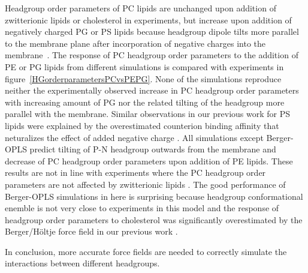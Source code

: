 \documentclass[journal=jpcbfk]{achemso}
\begin{document}
Headgroup order parameters of PC lipids are unchanged upon addition
of zwitterionic lipids or cholesterol in experiments, but increase
upon addition of negatively charged PG or PS lipids because
headgroup dipole tilts more parallel to the membrane plane after incorporation
of negative charges into the membrane~\cite{seelig87, scherer87,antila18}.
The response of PC headgroup order parameters to the addition of PE or PG lipids
from different simulations is compared with experiments in figure~\ref{HGorderparametersPCvsPEPG}.
None of the simulations reproduce neither the experimentally observed increase in PC headgroup order parameters
with increasing amount of PG nor the related tilting of the headgroup more parallel with the membrane.
Similar observations in our previous work for PS lipids were explained by the overestimated counterion
binding affinity that neturalizes the effect of added negative charge \cite{antila19}.
All simulations except Berger-OPLS predict tilting of P-N headgroup outwards from the membrane and
decrease of PC headgroup order parameters upon addition of PE lipids.
These results are not in line with experiments where the PC headgroup order parameters are not affected by zwitterionic lipids \cite{scherer87}.
The good performance of Berger-OPLS simulations in here is surprising because
headgroup conformational enemble is not very close to experiments in this model and
the response of headgroup order parameters
to cholesterol was significantly overestimated by the Berger/H{\"o}ltje force field in our previous work \cite{botan15}.

In conclusion, more accurate force fields are needed to correctly simulate the interactions between different headgroups.

\clearpage
\end{document}
